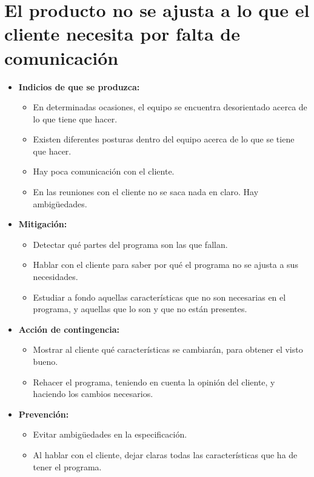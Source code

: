 \documentclass[spanish,a4paper,12pt]{report}	%
\begin{document}
	\section{El producto no se ajusta a lo que el cliente necesita por falta de comunicación}
		\begin{itemize}
			\item \textbf {Indicios de que se produzca: }
				\begin{itemize}
					\item En determinadas ocasiones, el equipo se encuentra desorientado acerca de lo que tiene que hacer.
					\item Existen diferentes posturas dentro del equipo acerca de lo que se tiene que hacer. 
					\item Hay poca comunicación con el cliente.
					\item En las reuniones con el cliente no se saca nada en claro. Hay ambigüedades.
				\end{itemize}
			\item \textbf {Mitigación: }
				\begin{itemize}
				  \item Detectar qué partes del programa son las que fallan.  
				  \item Hablar con el cliente para saber por qué el programa no se ajusta a sus necesidades. 
				  \item Estudiar a fondo aquellas características que no son necesarias en el programa, y aquellas
				  		que lo son y que no están presentes.
				\end{itemize} 
			\item \textbf {Acción de contingencia: }
				\begin{itemize}
				  \item  Mostrar al cliente qué características se cambiarán, para obtener el visto bueno.
				  \item Rehacer el programa, teniendo en cuenta la opinión del cliente, y haciendo los cambios necesarios.
				\end{itemize} 
			\item \textbf {Prevención: }
				\begin{itemize}
				  \item Evitar ambigüedades en la especificación.
				  \item Al hablar con el cliente, dejar claras todas las características que ha de tener el programa.  
				\end{itemize} 
			
		\end{itemize}
	
	
		


\newpage
\mbox{}
\thispagestyle{empty}						%
\newpage
\end{document}
